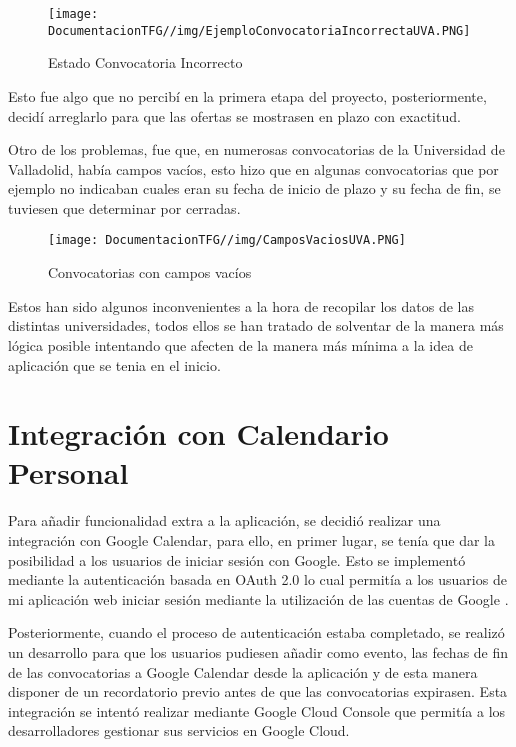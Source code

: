 \begin{figure}[H]
    \centering
    \texttt{[image: DocumentacionTFG//img/EjemploConvocatoriaIncorrectaUVA.PNG]}
    \caption{Estado Convocatoria Incorrecto}
\end{figure}

Esto fue algo que no percibí en la primera etapa del proyecto, posteriormente, decidí arreglarlo para que las ofertas se mostrasen en plazo con exactitud.

Otro de los problemas, fue que, en numerosas convocatorias de la Universidad de Valladolid, había campos vacíos, esto hizo que en algunas convocatorias que por ejemplo no indicaban cuales eran su fecha de inicio de plazo y su fecha de fin, se tuviesen que determinar por cerradas.

\begin{figure}[H]
    \centering
    \texttt{[image: DocumentacionTFG//img/CamposVaciosUVA.PNG]}
    \caption{Convocatorias con campos vacíos}
\end{figure}

Estos han sido algunos inconvenientes a la hora de recopilar los datos de las distintas universidades, todos ellos se han tratado de solventar de la manera más lógica posible intentando que afecten de la manera más mínima a la idea de aplicación que se tenia en el inicio.

\section{Integración con Calendario Personal}

Para añadir funcionalidad extra a la aplicación, se decidió realizar una integración con Google Calendar, para ello, en primer lugar, se tenía que dar la posibilidad a los usuarios de iniciar sesión con Google. Esto se implementó mediante la autenticación basada en OAuth 2.0 lo cual permitía a los usuarios de mi aplicación web iniciar sesión mediante la utilización de las cuentas de Google \cite{oauth2:latex}. 

Posteriormente, cuando el proceso de autenticación estaba completado, se realizó un desarrollo para que los usuarios pudiesen añadir como evento, las fechas de fin de las convocatorias a Google Calendar desde la aplicación y de esta manera disponer de un recordatorio previo antes de que las convocatorias expirasen. Esta integración se intentó realizar mediante Google Cloud Console que permitía a los desarrolladores gestionar sus servicios en Google Cloud.

